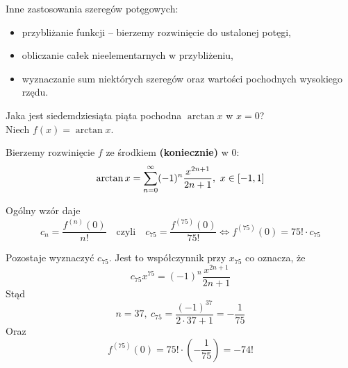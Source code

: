 Inne zastosowania szeregów potęgowych:

\begin{itemize}
    \item przybliżanie funkcji -- bierzemy rozwinięcie do ustalonej potęgi,
    \item obliczanie całek nieelementarnych w przybliżeniu,
    \item wyznaczanie sum niektórych szeregów oraz wartości pochodnych wysokiego rzędu.
\end{itemize}

\begin{przyklad}

Jaka jest siedemdziesiąta piąta pochodna $\arctan x$ w $x = 0$? \\

Niech $f(x) = \arctan x $. 

Bierzemy rozwinięcie $f$ ze środkiem \textbf{(koniecznie)} w $0$:
$$ \arctan x = \sum\limits_{n = 0}^{\infty} (-1)^n \frac{x^{2n+1}}{2n+1}, \ x\in [-1, 1] $$

Ogólny wzór daje
$$ c_n = \frac{f^{(n)}(0)}{n!} \quad \textrm{czyli} \quad c_{75} = \frac{f^{(75)}(0)}{75!} \Leftrightarrow f^{(75)}(0) = 75! \cdot c_{75} $$

Pozostaje wyznaczyć $c_{75}$. Jest to współczynnik przy $ x_{75} $ co oznacza, że
$$ c_{75} x^{75} = (-1)^n \frac{x^{2n+1}}{2n+1} $$
Stąd
$$ n = 37, \ c_{75} = \frac{(-1)^{37}}{2 \cdot 37 + 1} = - \frac{1}{75} $$
Oraz
$$ f^{(75)}(0) = 75! \cdot \left( - \frac{1}{75} \right) = -74! $$
\end{przyklad}

